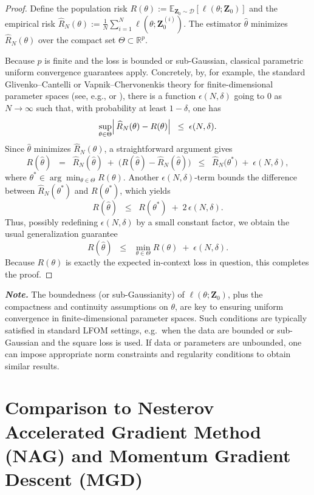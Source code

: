 \documentclass[11pt]{article}
\theoremstyle{plain}
\theoremstyle{definition}
\theoremstyle{remark}
\numberwithin{equation}{section}
\begin{document}
\begin{proof}
Define the population risk $R(\theta) := \mathbb{E}_{\mathbf{Z}_0 \sim \mathcal{D}} [\ell(\theta;\mathbf{Z}_0)]$ and the empirical risk $\widehat{R}_N(\theta) := \frac{1}{N}\sum_{i=1}^N \ell(\theta;\mathbf{Z}_0^{(i)})$. The estimator $\widehat{\theta}$ minimizes $\widehat{R}_N(\theta)$ over the compact set $\Theta \subset \mathbb{R}^p$.

Because $p$ is finite and the loss is bounded or sub-Gaussian, classical parametric uniform convergence guarantees apply. Concretely, by, for example, the standard Glivenko–Cantelli or Vapnik–Chervonenkis theory for finite-dimensional parameter spaces (see, e.g., \citet{shalev2014understanding} or \citet{geer2000empirical}), there is a function $\epsilon(N,\delta)$ going to $0$ as $N\to\infty$ such that, with probability at least $1-\delta$, one has
\[\sup_{\theta \in \Theta} \Bigl|\, \widehat{R}_N(\theta) - R(\theta)\Bigr| \;\;\le\; \epsilon(N,\delta).\]
Since $\widehat{\theta}$ minimizes $\widehat{R}_N(\theta)$, a straightforward argument gives
\[ R(\widehat{\theta}) \;\;=\;\; \widehat{R}_N(\widehat{\theta}) \;+\;\bigl(R(\widehat{\theta})-\widehat{R}_N(\widehat{\theta})\bigr) \;\;\le\;\; \widehat{R}_N\!\bigl(\theta^*\bigr) \;+\;\epsilon(N,\delta),\]
where $\theta^* \in \arg\min_{\theta \in \Theta} R(\theta)$. Another $\epsilon(N,\delta)$-term bounds the difference between $\widehat{R}_N(\theta^*)$ and $R(\theta^*)$, which yields
\[R(\widehat{\theta}) \;\;\le\;\; R(\theta^*) \;+\; 2\,\epsilon(N,\delta).\]
Thus, possibly redefining $\epsilon(N,\delta)$ by a small constant factor, we obtain the usual generalization guarantee
\[R(\widehat{\theta}) \;\;\le\;\; \min_{\theta\in\Theta} R(\theta) \;+\;\epsilon(N,\delta).\]
Because $R(\theta)$ is exactly the expected in-context loss in question, this completes the proof.
\end{proof}

\textbf{\textit{Note.}} The boundedness (or sub-Gaussianity) of $\ell(\theta;\mathbf{Z}_0)$, plus the compactness and continuity assumptions on $\theta$, are key to ensuring uniform convergence in finite-dimensional parameter spaces. Such conditions are typically satisfied in standard LFOM settings, e.g.\ when the data are bounded or sub-Gaussian and the square loss is used. If data or parameters are unbounded, one can impose appropriate norm constraints and regularity conditions to obtain similar results.

\section{Comparison to Nesterov Accelerated Gradient Method (NAG) and Momentum Gradient Descent (MGD)}
\end{document}
